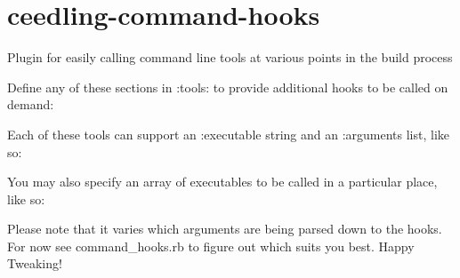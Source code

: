 \chapter{ceedling-\/command-\/hooks}
\hypertarget{md__unit_test_framework_2vendor_2ceedling_2plugins_2command__hooks_2_r_e_a_d_m_e}{}\label{md__unit_test_framework_2vendor_2ceedling_2plugins_2command__hooks_2_r_e_a_d_m_e}
Plugin for easily calling command line tools at various points in the build process

Define any of these sections in \+:tools\+: to provide additional hooks to be called on demand\+:


\begin{DoxyCode}{0}

\end{DoxyCode}


Each of these tools can support an \+:executable string and an \+:arguments list, like so\+:


\begin{DoxyCode}{0}

\end{DoxyCode}


You may also specify an array of executables to be called in a particular place, like so\+:


\begin{DoxyCode}{0}

\end{DoxyCode}


Please note that it varies which arguments are being parsed down to the hooks. For now see {\ttfamily command\+\_\+hooks.\+rb} to figure out which suits you best. Happy Tweaking! 